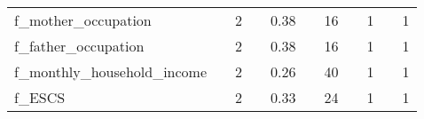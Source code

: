 \begin{table}[htbp]
{\begin{tabular}{l|ll|ll|ll|ll|ll}
f\_mother\_occupation & \cellcolor{red!0}{$2e-12~(\pm~1e-12)$} & 2  & \cellcolor{red!14}{$0.05~(\pm~0.02)$} & 0.38  & \cellcolor{red!3}{$0.41~~~~~(\pm~0.02)$} & 16  & \cellcolor{red!0}{$0.00~(\pm~0.00)$} & 1 & \cellcolor{red!0}{$0.00~(\pm~0.00)$} & 1 \\
f\_father\_occupation & \cellcolor{red!0}{$1e-12~(\pm~1e-12)$} & 2  & \cellcolor{red!18}{$0.07~(\pm~0.04)$} & 0.38  & \cellcolor{red!3}{$0.49~~~~~(\pm~0.04)$} & 16  & \cellcolor{red!0}{$0.00~(\pm~0.00)$} & 1 & \cellcolor{red!0}{$0.00~(\pm~0.00)$} & 1 \\
f\_monthly\_household\_income & \cellcolor{red!0}{$1e-14~(\pm~1e-14)$} & 2  & \cellcolor{red!12}{$0.03~(\pm~0.01)$} & 0.26  & \cellcolor{red!3}{$1.40~~~~~(\pm~0.41)$} & 40  & \cellcolor{red!21}{$0.21~(\pm~0.04)$} & 1 & \cellcolor{red!2}{$0.02~(\pm~0.00)$} & 1 \\
f\_ESCS & \cellcolor{red!0}{$1e-12~(\pm~5e-13)$} & 2  & \cellcolor{red!17}{$0.06~(\pm~0.00)$} & 0.33  & \cellcolor{red!7}{$1.58~~~~~(\pm~0.07)$} & 24  & \cellcolor{red!0}{$0.00~(\pm~0.00)$} & 1 & \cellcolor{red!0}{$0.00~(\pm~0.00)$} & 1 \\

\end{tabular}
}
\end{table}